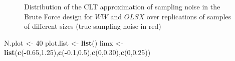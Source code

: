 \documentclass[]{book}
\newenvironment{Shaded}{\begin{snugshade}}{\end{snugshade}}
\newcommand{\DecValTok}[1]{\textcolor[rgb]{0.00,0.00,0.81}{#1}}
\newcommand{\FloatTok}[1]{\textcolor[rgb]{0.00,0.00,0.81}{#1}}
\newcommand{\KeywordTok}[1]{\textcolor[rgb]{0.13,0.29,0.53}{\textbf{#1}}}
\newcommand{\NormalTok}[1]{#1}
\newcommand{\OperatorTok}[1]{\textcolor[rgb]{0.81,0.36,0.00}{\textbf{#1}}}
\newcommand{\StringTok}[1]{\textcolor[rgb]{0.31,0.60,0.02}{#1}}
\theoremstyle{definition}
\theoremstyle{definition}
\theoremstyle{definition}
\theoremstyle{remark}
\begin{document}
\begin{figure}[htbp]

{\centering {}

}

\caption{Distribution of the CLT approximation of sampling noise in the Brute Force design for $WW$ and $OLSX$ over replications of samples of different sizes (true sampling noise in red)}\label{fig:sampnoisewwBFCLTall}
\end{figure}

\begin{Shaded}
\begin{Highlighting}[]
\NormalTok{N.plot <-}\StringTok{ }\DecValTok{40}
\NormalTok{plot.list <-}\StringTok{ }\KeywordTok{list}\NormalTok{()}
\NormalTok{limx <-}\StringTok{ }\KeywordTok{list}\NormalTok{(}\KeywordTok{c}\NormalTok{(}\OperatorTok{-}\FloatTok{0.65}\NormalTok{,}\FloatTok{1.25}\NormalTok{),}\KeywordTok{c}\NormalTok{(}\OperatorTok{-}\FloatTok{0.1}\NormalTok{,}\FloatTok{0.5}\NormalTok{),}\KeywordTok{c}\NormalTok{(}\DecValTok{0}\NormalTok{,}\FloatTok{0.30}\NormalTok{),}\KeywordTok{c}\NormalTok{(}\DecValTok{0}\NormalTok{,}\FloatTok{0.25}\NormalTok{))}


\end{Highlighting}
\end{Shaded}
\end{document}
